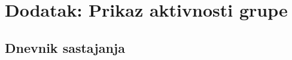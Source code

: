 \chapter*{Dodatak: Prikaz aktivnosti grupe}
		
		\section*{Dnevnik sastajanja}
		
		
		
		\newcommand{\mylabel}[2]{#2\def\@currentlabel{#2}\label{#1}}  %
		
